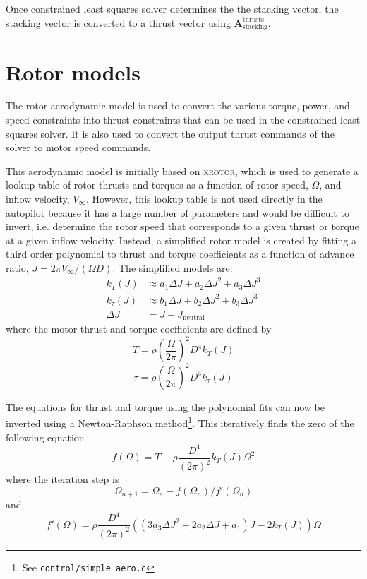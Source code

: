 \documentclass[11pt]{amsart}
\newcommand{\Astackingthrusts}{\mathbf{A}_{\mathrm{stacking}}^{\mathrm{thrusts}}}
\begin{document}
Once constrained least squares solver determines the the stacking
vector, the stacking vector is converted to a thrust vector using
$\Astackingthrusts$.

\section{Rotor models}
\label{sec:rotor_models}

The rotor aerodynamic model is used to convert the various torque,
power, and speed constraints into thrust constraints that can be used
in the constrained least squares solver.  It is also used to convert
the output thrust commands of the solver to motor speed commands.

This aerodynamic model is initially based on \textsc{xrotor}, which is
used to generate a lookup table of rotor thrusts and torques as a
function of rotor speed, $\Omega$, and inflow velocity, $V_{\infty}$.
However, this lookup table is not used directly in the autopilot
because it has a large number of parameters and would be difficult to
invert, i.e. determine the rotor speed that corresponds to a given
thrust or torque at a given inflow velocity.  Instead, a simplified
rotor model is created by fitting a third order polynomial to thrust
and torque coefficients as a function of advance ratio,
$J = 2 \pi V_{\infty} / (\Omega D)$.  The simplified models are:
%
\begin{align}
  k_T(J)      &\approx a_1 \Delta J + a_2 \Delta J^2 + a_3 \Delta J^3 \\
  k_{\tau}(J) &\approx b_1 \Delta J + b_2 \Delta J^2 + b_3 \Delta J^3 \\
  \Delta J    &= J - J_{\mathrm{neutral}}
\end{align}
%
where the motor thrust and torque coefficients are defined by
%
\begin{equation}
  T = \rho \left(\frac{\Omega}{2 \pi}\right)^2 D^4 k_T(J)
\end{equation}
%
\begin{equation}
  \tau = \rho \left(\frac{\Omega}{2 \pi}\right)^2 D^5 k_{\tau}(J)
\end{equation}

The equations for thrust and torque using the polynomial fits can now
be inverted using a Newton-Raphson method\footnote{ See
  {\texttt{control/simple\_aero.c}}}.  This iteratively
finds the zero of the following equation
%
\begin{equation}
  f(\Omega) = T - \rho \frac{D^4}{(2 \pi)^2} k_T(J) \Omega^2
\end{equation}
%
where the iteration step is
%
\begin{equation}
  \Omega_{n+1} = \Omega_n - f(\Omega_n) / f'(\Omega_n)
\end{equation}
%
and
%
\begin{equation}
  f'(\Omega) = \rho \frac{D^4}{(2 \pi)^2} \left(
  (3 a_3 \Delta J^2 + 2 a_2 \Delta J + a_1) J - 2 k_T(J) \right) \Omega
\end{equation}
\end{document}
